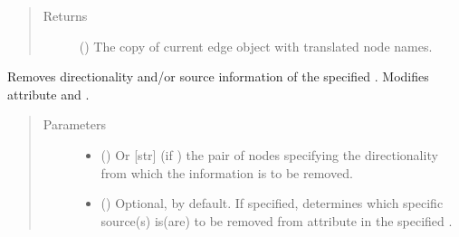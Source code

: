 \documentclass[letterpaper,10pt,english]{sphinxmanual}
\begin{document}
\begin{fulllineitems}
\begin{fulllineitems}
\begin{quote}
\begin{description}
\item[{Returns}] \leavevmode
() \textendash{} The copy of current edge object
with translated node names.

\end{description}\end{quote}

\end{fulllineitems}


\begin{fulllineitems}
\label{\detokenize{main:pypath.main.Direction.unset_dir}}
Removes directionality and/or source information of the
specified . Modifies attribute  and
.
\begin{quote}\begin{description}
\item[{Parameters}] \leavevmode\begin{itemize}
\item {} 
 () \textendash{} Or {[}str{]} (if ) the pair of nodes specifying
the directionality from which the information is to be
removed.

\item {} 
 () \textendash{} Optional,  by default. If specified, determines
which specific source(s) is(are) to be removed from
 attribute in the specified .

\end{itemize}

\end{description}\end{quote}

\end{fulllineitems}



\end{fulllineitems}
\end{document}
